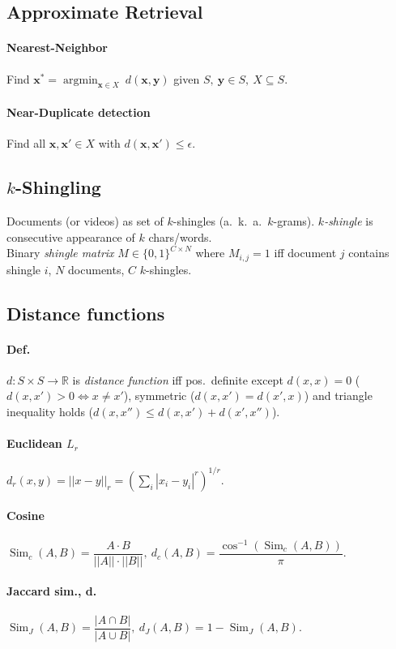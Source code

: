 \documentclass[11pt]{scrartcl}
\DeclareMathOperator{\argmin}{argmin}
\DeclareMathOperator{\Sim}{Sim}
\newcommand{\eps}{\epsilon}
\newcommand{\R}{\mathbb{R}}
\begin{document}
\begin{multicols}{3}

\section{Approximate Retrieval}
\paragraph{Nearest-Neighbor} Find $\bm x^* = \argmin_{\bm x \in X} \ d(\bm x,\bm y)$
given $S,\ \bm y \in S,\ X\subseteq S$.
\paragraph{Near-Duplicate detection}
Find all $\bm x, \bm x'\in X$ with $d(\bm x,\bm x') \leq \eps$.
\subsection{$k$-Shingling}
Documents (or videos) as set of $k$-shingles (a.\ k.\ a.\ $k$-grams).
\emph{$k$-shingle} is consecutive appearance of $k$ chars/words. \\
Binary \emph{shingle matrix} $M \in \{0,1\}^{C \times N}$ where $M_{i,j} = 1$ iff document $j$ contains shingle $i$, $N$ documents, $C$ $k$-shingles.
\subsection{Distance functions}
\paragraph{Def.}
$d: S \times S \rightarrow \R$ is \emph{distance function} iff pos.\ definite except $d(x,x) = 0$ ($d(x,x') > 0 \iff x \neq x'$), symmetric ($d(x,x') = d(x',x)$) and triangle inequality holds ($d(x,x'') \leq d(x,x') + d(x',x'')$).
\paragraph{Euclidean $L_r$}
$d_r(x,y) = ||x-y||_r = (\sum_i |x_i - y_i|^r)^{1/r}$.
\paragraph{Cosine}
$\Sim_c(A,B) = \dfrac{A \cdot B}{||A||\cdot||B||},\ d_c(A,B) = \dfrac{\cos^{-1}(\Sim_c(A,B))}{\pi}.$
\paragraph{Jaccard sim., d.}
$\Sim_J(A,B) = \dfrac{|A \cap B|}{|A \cup B|},\ d_J(A,B) = 1 - \Sim_J(A,B).$


\end{multicols}
\end{document}
